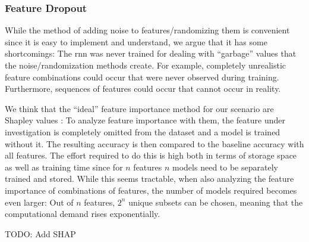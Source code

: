 \documentclass[conference]{IEEEtran}
\newcommand\note[2]{{\color{#1}#2}}
\newcommand\todo[1]{{\note{red}{TODO: #1}}}
\begin{document}
\subsubsection{Feature Dropout}
While the method of adding noise to features/randomizing them is convenient since it is easy to implement and understand, we argue that it has some shortcomings: 
The \gls{rnn} was never trained for dealing with ``garbage'' values that the noise/randomization methods create. For example, completely unrealistic feature combinations could occur that were never observed during training. Furthermore, sequences of features could occur that cannot occur in reality. 
 
We think that the ``ideal'' feature importance method for our scenario are Shapley values \cite{shapley_value_1952}: To analyze feature importance with them, the feature under investigation is completely omitted from the dataset and a model is trained without it. The resulting accuracy is then compared to the baseline accuracy with all features. The effort required to do this is high both in terms of storage space as well as training time since for $n$ features $n$ models need to be separately trained and stored. While this seems tractable, when also analyzing the feature importance of combinations of features, the number of models required becomes even larger: Out of $n$ features, $2^n$ unique subsets can be chosen, meaning that the computational demand rises exponentially. 

\todo{Add SHAP}
\end{document}
